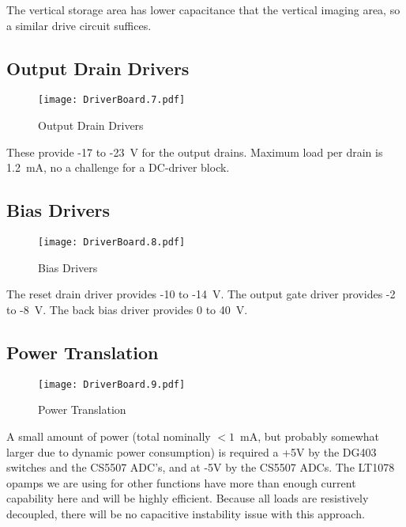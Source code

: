 \documentclass[a4paper,12pt]{article}
\begin{document}
The vertical storage area has lower capacitance that the vertical imaging area, so a similar drive circuit suffices.

\subsection{Output Drain Drivers}
   \begin{figure}
   \begin{center}
   \texttt{[image: DriverBoard.7.pdf]}
   \end{center}
   \caption{Output Drain Drivers}
   \end{figure}

These provide -17 to -23\ V for the output drains. Maximum load per drain is 1.2\ mA, no a challenge for a DC-driver block.  

\subsection{Bias Drivers}
   \begin{figure}
   \begin{center}
   \texttt{[image: DriverBoard.8.pdf]}
   \end{center}
   \caption{Bias Drivers}
   \end{figure}
  
The reset drain driver provides -10 to -14\ V. 
The output gate driver provides -2 to -8\ V.
The back bias driver provides 0 to 40\ V.

\subsection{Power Translation}
   \begin{figure}
   \begin{center}
   \texttt{[image: DriverBoard.9.pdf]}
   \end{center}
   \caption{Power Translation}
   \end{figure}
  
A small amount of power (total nominally $<1$\ mA, but probably somewhat larger due to dynamic power consumption) is required a +5V by the DG403 switches and the CS5507 ADC's, and at -5V by the CS5507 ADCs. The LT1078 opamps we are using for other functions have more than enough current capability here and will be highly efficient. Because all loads are resistively decoupled, there will be no capacitive instability issue with this approach.
  
\end{document}
